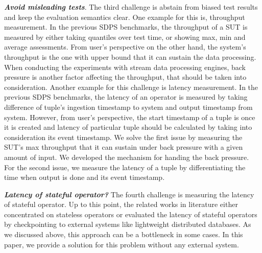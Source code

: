 \documentclass{vldb}
\begin{document}
\textbf{ \textit{ Avoid misleading tests}}.
The third challenge is abstain from biased test results and keep the evaluation semantics clear.  One example for this is, throughput measurement. In the previous SDPS benchmarks, the throughput of a SUT is measured by either taking quantiles over test time, or showing max, min and average assessments. From user's perspective on the other hand, the system's throughput is the one with upper bound that it can sustain the data processing. When conducting the experiments with stream data processing engines, back pressure is another factor affecting the throughput, that should be taken into consideration.  Another example for this challenge is latency measurement. In the previous SDPS benchmarks, the latency of an operator is measured by taking difference of tuple's ingestion timestamp to system and output timestamp from system. However, from user's perspective, the start timestamp of a tuple is once it is created and latency of particular tuple should be calculated by taking into consideration its event timestamp. We solve the first issue by measuring the SUT's max throughput that it can sustain under back pressure with a given amount of input. We developed the mechanism for handing the back pressure.  For the second issue, we measure the latency of a tuple by differentiating the time when output is done and its event timestamp.


\textbf{ \textit{ Latency of stateful operator?}} The fourth challenge is measuring the latency of stateful operator. Up to this point, the related works in literature either concentrated on stateless operators or evaluated the latency of stateful operators by checkpointing to external systems like lightweight distributed databases. As we discussed above, this approach can be a bottleneck in some cases. In this paper, we provide a solution for this problem without any external system. 
\end{document}
